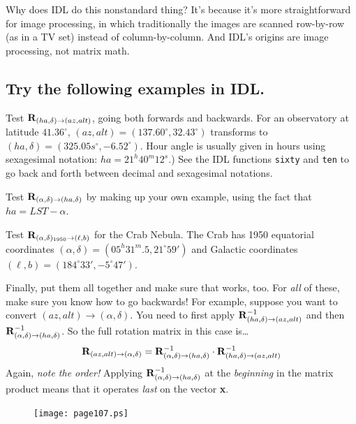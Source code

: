 \documentclass[11pt,preprint]{aastex}
\begin{document}
	Why does IDL do this nonstandard thing? It's because it's more
straightforward for image processing, in which traditionally the images
are scanned row-by-row (as in a TV set) instead of column-by-column. And
IDL's origins are image processing, not matrix math.

\subsection {Try the following examples in IDL.}

Test ${\bf R}_{(ha, \delta) \rightarrow (az, alt)}$, going both forwards
and backwards. For an observatory at latitude $41.36^\circ$,
$(az,alt)=(137.60^\circ,32.43^\circ)$ transforms to
$(ha,\delta)=(325.05s^\circ, -6.52^\circ)$.  Hour angle is usually given
in hours using sexagesimal notation: $ha=21^h40^m12^{s}$.) See the IDL
functions {\tt sixty} and {\tt ten} to go back and forth between decimal
and sexagesimal notations.

	Test ${\bf R}_{(\alpha, \delta) \rightarrow (ha, \delta)}$ by
making up your own example, using the fact that $ha = LST - \alpha$. 

	Test ${\bf R}_{(\alpha, \delta)_{1950} \rightarrow (\ell, b)}$
for the Crab Nebula. The Crab has 1950
equatorial coordinates $(\alpha, \delta)=(05^h31^m.5, 21^\circ59')$ and
Galactic coordinates $(\ell,b)=(184^\circ33', -5^\circ47')$.

	Finally, put them all together and make sure that works, too. 
For {\it all} of these, make sure you know how to go backwards! For
example, suppose you want to convert $(az, alt) \rightarrow (\alpha,
\delta)$.  You need to first apply ${\bf R}_{(ha, \delta) \rightarrow
(az, alt)}^{-1}$ and then ${\bf R}_{(\alpha, \delta) \rightarrow (ha,
\delta)}^{-1}$.  So the full rotation matrix in this case is\dots
\begin{equation}
{\bf R}_{(az, alt) \rightarrow (\alpha, \delta)} = 
{\bf R}_{(\alpha, \delta) \rightarrow (ha, \delta)}^{-1} \cdot
{\bf R}_{(ha, \delta) \rightarrow (az, alt)}^{-1}
\end{equation}
\noindent Again, {\it note the order!} Applying ${\bf R}_{(\alpha,
\delta) \rightarrow (ha, \delta)}^{-1}$ at the {\it beginning} in the
matrix product means that it operates {\it last} on the vector {\bf x}. 

\begin{figure}
\texttt{[image: page107.ps]}
\end{figure}  
\end{document}
